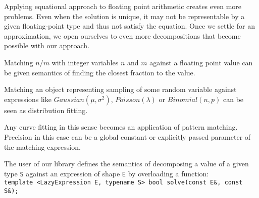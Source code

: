 \documentclass{llncs}
\makeatletter
\DeclareRobustCommand{\code}[1]{{\lstinline[keepspaces,breaklines=false,escapechar=@]{#1}}}
\makeatother
\begin{document}
Applying equational approach to floating point arithmetic creates even more 
problems. Even when the solution is unique, it may not be representable by 
a given floating-point type and thus not satisfy the equation. Once we settle 
for an approximation, we open ourselves to even more decompositions that become 
possible with our approach.

\begin{compactitem}
\setlength{\itemsep}{0pt}
\setlength{\parskip}{0pt}
\item Matching $n/m$ with integer variables $n$ and $m$ against a floating point 
      value can be given semantics of finding the closest fraction to the 
      value.
\item Matching an object representing sampling of some random variable against
      expressions like $Gaussian(\mu,\sigma^2)$, $Poisson(\lambda)$ or 
      $Binomial(n,p)$ can be seen as distribution fitting. 
\item Any curve fitting in this sense becomes an application of pattern 
      matching. Precision in this case can be a global constant or explicitly 
      passed parameter of the matching expression.
\end{compactitem}




\noindent
The user of our library defines the semantics of decomposing a value of a given 
type \code{S} against an expression of shape \code{E} by overloading a function: 
\\ \code{template <LazyExpression E, typename S> bool solve(const E&, const S&);}
\end{document}
